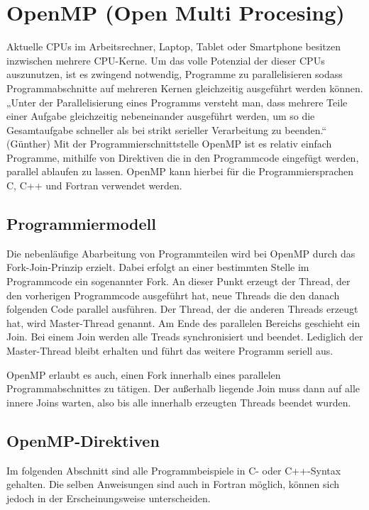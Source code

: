 \documentclass[../main.tex]{subfiles}
\begin{document}
\section{OpenMP (Open Multi Procesing)}

Aktuelle CPUs im Arbeitsrechner, Laptop, Tablet oder Smartphone besitzen inzwischen mehrere CPU-Kerne. Um das volle Potenzial der dieser CPUs auszunutzen, ist es zwingend notwendig, Programme zu parallelisieren sodass Programmabschnitte auf mehreren Kernen gleichzeitig ausgeführt werden können.
„Unter der Parallelisierung eines Programms versteht man, dass mehrere Teile einer Aufgabe gleichzeitig nebeneinander ausgeführt werden, um so die Gesamtaufgabe schneller als bei strikt serieller Verarbeitung zu beenden.“ (Günther)
Mit der Programmierschnittstelle OpenMP ist es relativ einfach Programme, mithilfe von Direktiven die in den Programmcode eingefügt werden, parallel ablaufen zu lassen. OpenMP kann hierbei für die Programmiersprachen C, C++ und Fortran verwendet werden.

\subsection{Programmiermodell}

Die nebenläufige Abarbeitung von Programmteilen wird bei OpenMP durch das Fork-Join-Prinzip erzielt. Dabei erfolgt an einer bestimmten Stelle im Programmcode ein sogenannter Fork. An dieser Punkt erzeugt der Thread, der den vorherigen Programmcode ausgeführt hat, neue Threads die den danach folgenden Code parallel ausführen. Der Thread, der die anderen Threads erzeugt hat, wird Master-Thread genannt. Am Ende des parallelen Bereichs geschieht ein Join. Bei einem Join werden alle Treads synchronisiert und beendet. Lediglich der Master-Thread bleibt erhalten und führt das weitere Programm seriell aus.

OpenMP erlaubt es auch, einen Fork innerhalb eines parallelen Programmabschnittes zu tätigen. Der außerhalb liegende Join muss dann auf alle innere Joins warten, also bis alle innerhalb erzeugten Threads beendet wurden.

\subsection{OpenMP-Direktiven}

Im folgenden Abschnitt sind alle Programmbeispiele in C- oder C++-Syntax gehalten. Die selben Anweisungen sind auch in Fortran möglich, können sich jedoch in der Erscheinungsweise unterscheiden.
\end{document}
